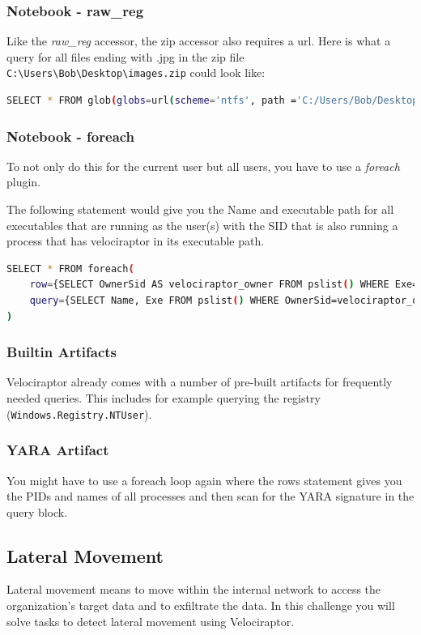 \subsubsection{Notebook - raw\_reg}
Like the \textit{raw\_reg} accessor, the zip accessor also requires a url. Here is what a query for all files ending with .jpg in the zip file \lstinline|C:\Users\Bob\Desktop\images.zip| could look like:

\begin{lstlisting}[language=bash]
    SELECT * FROM glob(globs=url(scheme='ntfs', path ='C:/Users/Bob/Desktop/images.zip', fragment='/**/*.jpg').String, accessor='zip')
\end{lstlisting}

\subsubsection{Notebook - foreach}
To not only do this for the current user but all users, you have to use a \textit{foreach} plugin.

The following statement would give you the Name and executable path for all executables that are running as the user(s) with the SID that is also running a process that has velociraptor in its executable path.

\begin{lstlisting}[language=bash]
    SELECT * FROM foreach(
    row={SELECT OwnerSid AS velociraptor_owner FROM pslist() WHERE Exe=~'velociraptor'},
    query={SELECT Name, Exe FROM pslist() WHERE OwnerSid=velociraptor_owner}
)
\end{lstlisting}

\subsubsection{Builtin Artifacts}
Velociraptor already comes with a number of pre-built artifacts for frequently needed queries.
This includes for example querying the registry (\lstinline|Windows.Registry.NTUser|).

\subsubsection{YARA Artifact}
You might have to use a foreach loop again where the rows statement gives you the PIDs and names of all processes and then scan for the YARA signature in the query block.



\subsection{Lateral Movement}
Lateral movement means to move within the internal network to access the organization's target data and to exfiltrate the data. In this challenge you will solve tasks to detect lateral movement using Velociraptor.

